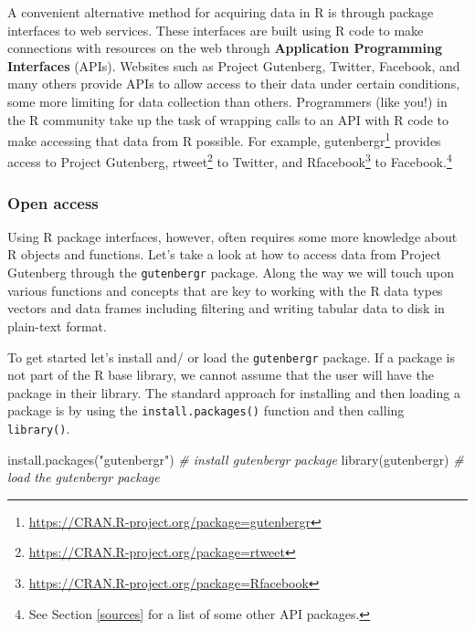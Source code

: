 \documentclass[
]{article}
\newenvironment{Shaded}{\begin{snugshade}}{\end{snugshade}}
\newcommand{\CommentTok}[1]{\textcolor[rgb]{0.56,0.35,0.01}{\textit{#1}}}
\newcommand{\FunctionTok}[1]{\textcolor[rgb]{0.00,0.00,0.00}{#1}}
\newcommand{\NormalTok}[1]{#1}
\newcommand{\StringTok}[1]{\textcolor[rgb]{0.31,0.60,0.02}{#1}}
\DeclareRobustCommand{\href}[2]{#2\footnote{\url{#1}}}
\begin{document}
A convenient alternative method for acquiring data in R is through package interfaces to web services. These interfaces are built using R code to make connections with resources on the web through \textbf{Application Programming Interfaces} (APIs). Websites such as Project Gutenberg, Twitter, Facebook, and many others provide APIs to allow access to their data under certain conditions, some more limiting for data collection than others. Programmers (like you!) in the R community take up the task of wrapping calls to an API with R code to make accessing that data from R possible. For example, \href{https://CRAN.R-project.org/package=gutenbergr}{gutenbergr} provides access to Project Gutenberg, \href{https://CRAN.R-project.org/package=rtweet}{rtweet} to Twitter, and \href{https://CRAN.R-project.org/package=Rfacebook}{Rfacebook} to Facebook.\footnote{See Section \ref{sources} for a list of some other API packages.}

\hypertarget{open-access}{%
\subsubsection{Open access}\label{open-access}}

Using R package interfaces, however, often requires some more knowledge about R objects and functions. Let's take a look at how to access data from Project Gutenberg through the \texttt{gutenbergr} package. Along the way we will touch upon various functions and concepts that are key to working with the R data types vectors and data frames including filtering and writing tabular data to disk in plain-text format.

To get started let's install and/ or load the \texttt{gutenbergr} package. If a package is not part of the R base library, we cannot assume that the user will have the package in their library. The standard approach for installing and then loading a package is by using the \texttt{install.packages()} function and then calling \texttt{library()}.

\begin{Shaded}
\begin{Highlighting}[]
\FunctionTok{install.packages}\NormalTok{(}\StringTok{"gutenbergr"}\NormalTok{)  }\CommentTok{\# install \textasciigrave{}gutenbergr\textasciigrave{} package}
\FunctionTok{library}\NormalTok{(gutenbergr)  }\CommentTok{\# load the \textasciigrave{}gutenbergr\textasciigrave{} package}
\end{Highlighting}
\end{Shaded}
\end{document}
